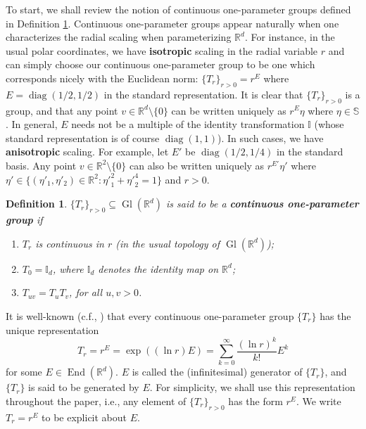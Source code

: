 \documentclass[11pt, letter]{book}
\newtheorem{definition}[theorem]{Definition}
\newcommand\End{\operatorname{End}} %
\newcommand\Gl{\operatorname{Gl}} %
\newcommand\diag{\operatorname{diag}}
\begin{document}
\noindent 
To start, we shall review the notion of continuous one-parameter groups defined in Definition \ref{def:cont_one_param_group}. Continuous one-parameter groups appear naturally when one characterizes the radial scaling when parameterizing $\mathbb{R}^d$. For instance, in the usual polar coordinates, we have \textbf{isotropic} scaling in the radial variable $r$ and can simply choose our continuous one-parameter group to be one which corresponds nicely with the Euclidean norm: $\{T_r \}_{r>0} = r^E$ where $E=\diag(1/2, 1/2)$ in the standard representation. It is clear that $\{T_r \}_{r>0}$ is a group, and that any point $v\in \mathbb{R}^d \setminus \{0\}$ can be written uniquely as $r^E \eta$ where $\eta\in \mathbb{S}$. In general, $E$ needs not be a multiple of the identity transformation $\mathbb{I}$ (whose standard representation is of course $\diag(1,1)$). In such cases, we have \textbf{anisotropic} scaling. For example, let $E'$ be $\diag(1/2, 1/4)$ in the standard basis. Any point $v\in \mathbb{R}^2\setminus\{0\}$ can also be written uniquely as $r^{E'}\eta'$ where $\eta' \in \{ (\eta'_1,\eta'_2) \in \mathbb{R}^2 : {\eta'}_1^{2} + {\eta'}_2^{4} = 1  \}$ and $r> 0$. 

\begin{framed}
\begin{definition}\label{def:cont_one_param_group}
$\{T_r \}_{r>0} \subseteq \Gl{(\mathbb{R}^d)}$ is said to be a \textbf{continuous one-parameter group} if
\begin{enumerate}
    \item $T_r$ is continuous in $r$ (in the usual topology of $\Gl({\mathbb{R}^d})$);    
    \item $T_0 = \mathbb{I}_d$, where $\mathbb{I}_d$ denotes the identity map on $\mathbb{R}^d$;
    \item $T_{uv} = T_u T_v$, for all $u,v >0$. 
\end{enumerate}
\end{definition}
\end{framed}
\noindent It is well-known (c.f., \cite{randles_convolution_2017,engel_one-parameter_2000,engel_short_2006}) that every continuous one-parameter group $\{T_r\}$ has the unique representation
\begin{equation*}
T_r=r^E=\exp((\ln r) E)=\sum_{k=0}^\infty \frac{(\ln r)^k}{k!}E^k
\end{equation*}
for some $E\in\End(\mathbb{R}^d)$. $E$ is called the (infinitesimal) generator of $\{T_r\}$, and $\{T_r\}$ is said to be generated by $E$. For simplicity, we shall use this representation throughout the paper, i.e., any element of $\{T_r \}_{r>0}$ has the form $r^E$. We write $T_r= r^E$ to be explicit about $E$.\\
\end{document}
